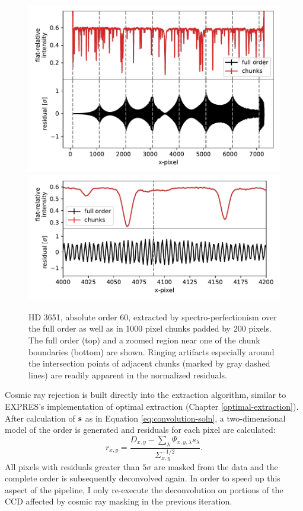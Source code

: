 \begin{figure}
    \centering
    \includegraphics[width=\textwidth]{figures-5/spec-perf-ringing-1.pdf}
    \includegraphics[width=\textwidth]{figures-5/spec-perf-ringing-2.pdf}
    \caption[Ringing artifacts from chunked spectro-perfectionism]{HD 3651, absolute order 60, extracted by spectro-perfectionism over the full order as well as in 1000 pixel chunks padded by 200 pixels. The full order (top) and a zoomed region near one of the chunk boundaries (bottom) are shown. Ringing artifacts especially around the intersection points of adjacent chunks (marked by gray dashed lines) are readily apparent in the normalized residuals.}
    \label{fig:spec-perf-ringing}
\end{figure}

Cosmic ray rejection is built directly into the extraction algorithm, similar to EXPRES's implementation of optimal extraction (Chapter \ref{optimal-extraction}). After calculation of $\vb{s}$ as in Equation \ref{eq:convolution-soln}, a two-dimensional model of the order is generated and residuals for each pixel are calculated:
\begin{equation}
    r_{x,y} = \frac{D_{x,y} - \sum_\lambda{\Psi_{x,y,\lambda}s_\lambda}} {\Sigma_{x,y}^{-1/2}}.
    \label{eq:spec-perf-resid}
\end{equation}
All pixels with residuals greater than $5\sigma$ are masked from the data and the complete order is subsequently deconvolved again. In order to speed up this aspect of the pipeline, I only re-execute the deconvolution on portions of the CCD affected by cosmic ray masking in the previous iteration.

